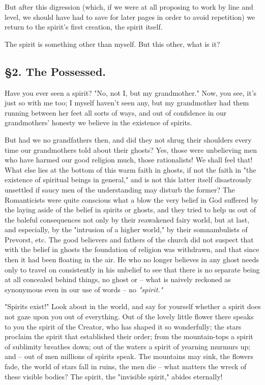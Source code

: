 \documentclass[a4paper]{book}
\begin{document}
But after this digression (which, if we were at all proposing to work by line 
and level, we should have had to save for later pages in order to avoid 
repetition) we return to the spirit's first creation, the spirit itself.

The spirit is something other than myself. But this other, what is it?

\medskip{}

\subsection[\S{}2. The Possessed]{\centering \S{}2. The Possessed.}

Have you ever seen a spirit? "{}No, not I, but my grandmother."{} Now, you 
see, it's just so with me too; I myself haven't seen any, but my grandmother 
had them running between her feet all sorts of ways, and out of confidence in 
our grandmothers' honesty we believe in the existence of spirits.

But had we no grandfathers then, and did they not shrug their shoulders every 
time our grandmothers told about their ghosts? Yes, those were unbelieving men 
who have harmed our good religion much, those rationalists! We shall feel 
that! What else lies at the bottom of this warm faith in ghosts, if not the 
faith in "{}the existence of spiritual beings in general,"{} and is not this 
latter itself disastrously unsettled if saucy men of the understanding may 
disturb the former? The Romanticists were quite conscious what a blow the very 
belief in God suffered by the laying aside of the belief in spirits or ghosts, 
and they tried to help us out of the baleful consequences not only by their 
reawakened fairy world, but at last, and especially, by the "{}intrusion of a 
higher world,"{} by their somnambulists of Prevorst, etc. The good believers 
and fathers of the church did not suspect that with the belief in ghosts the 
foundation of religion was withdrawn, and that since then it had been floating 
in the air. He who no longer believes in any ghost needs only to travel on 
consistently in his unbelief to see that there is no separate being at all 
concealed behind things, no ghost or -- what is naively reckoned as synonymous 
even in our use of words -- no \textit{"{}spirit."{}}

"{}Spirits exist!"{} Look about in the world, and say for yourself whether a 
spirit does not gaze upon you out of everything. Out of the lovely little 
flower there speaks to you the spirit of the Creator, who has shaped it so 
wonderfully; the stars proclaim the spirit that established their order; from 
the mountain-tops a spirit of sublimity breathes down; out of the waters a 
spirit of yearning murmurs up; and -- out of men millions of spirits speak. 
The mountains may sink, the flowers fade, the world of stars fall in ruins, 
the men die -- what matters the wreck of these visible bodies? The spirit, the 
"{}invisible spirit,"{} abides eternally!
\end{document}
